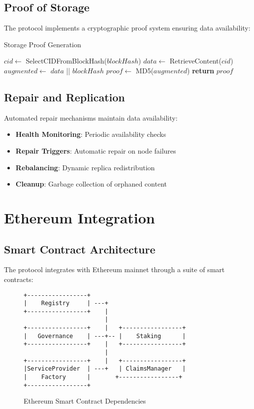 \documentclass[11pt,a4paper]{article}
\begin{document}
\subsection{Proof of Storage}

The protocol implements a cryptographic proof system ensuring data availability:

\begin{algorithm}
  \caption{Storage Proof Generation}
  \begin{algorithmic}[1]
    \STATE $cid \leftarrow$ SelectCIDFromBlockHash($blockHash$)
    \STATE $data \leftarrow$ RetrieveContent($cid$)
    \STATE $augmented \leftarrow$ $data$ || $blockHash$
    \STATE $proof \leftarrow$ MD5($augmented$)
    \STATE \textbf{return} $proof$
  \end{algorithmic}
\end{algorithm}

\subsection{Repair and Replication}

Automated repair mechanisms maintain data availability:

\begin{itemize}
  \item \textbf{Health Monitoring}: Periodic availability checks
  \item \textbf{Repair Triggers}: Automatic repair on node failures
  \item \textbf{Rebalancing}: Dynamic replica redistribution
  \item \textbf{Cleanup}: Garbage collection of orphaned content
\end{itemize}

\section{Ethereum Integration}

\subsection{Smart Contract Architecture}

The protocol integrates with Ethereum mainnet through a suite of smart contracts:

\begin{figure}[H]
  \centering
\begin{verbatim}
+-----------------+
|    Registry     | ---+
+-----------------+    |
                       |
+-----------------+    |   +-----------------+
|   Governance    | ---+-- |    Staking      |
+-----------------+    |   +-----------------+
                       |
+-----------------+    |   +-----------------+
|ServiceProvider  | ---+   | ClaimsManager   |
|    Factory      |       +-----------------+
+-----------------+
\end{verbatim}
  \caption{Ethereum Smart Contract Dependencies}
\end{figure}
\end{document}
